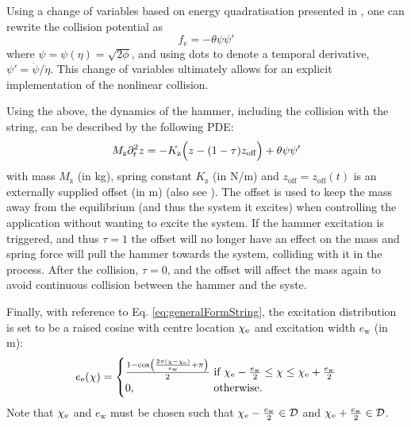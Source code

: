 \documentclass{article}
\begin{document}
Using a change of variables based on energy quadratisation presented in \cite{Ducceschi2021}, one can rewrite the collision potential as
\begin{equation}
    f_\text{e} = -\theta\psi \psi'
\end{equation}
where $\psi = \psi(\eta) = \sqrt{2\phi}$, and using dots to denote a temporal derivative, $\psi' = \dot \psi / \dot \eta$. This change of variables ultimately allows for an explicit implementation of the nonlinear collision. 

Using the above, the dynamics of the hammer, including the collision with the string, can be described by the following PDE:
\begin{equation}\label{eq:massSpring}
    M_\text{z}\partial_t^2 z = -K_\text{z} \Big(z - (1-\tau)z_\text{off}\Big) + \theta \psi\psi'
\end{equation}
with mass $M_\text{z}$ (in kg), spring constant $K_\text{z}$ (in N/m) and $z_\text{off} = z_\text{off}(t)$ is an externally supplied offset (in m) (also see \cite{Willemsen2020}). The offset is used to keep the mass away from the equilibrium (and thus the system it excites) when controlling the application without wanting to excite the system. If the hammer excitation is triggered, and thus $\tau = 1$ the offset will no longer have an effect on the mass and spring force will pull the hammer towards the system, colliding with it in the process. After the collision, $\tau = 0$, and the offset will affect the mass again to avoid continuous collision between the hammer and the syste. 

Finally, with reference to Eq. \eqref{eq:generalFormString}, the excitation distribution is set to be a raised cosine with centre location $\chi_{\text{e}}$ and excitation width $e_\text{w}$ (in m):
\begin{equation}\label{eq:raisedCos}
    e_\etxt(\chi) = \begin{cases}
        \frac{1 - \cos\left(\frac{2\pi (\chi - \chi_\etxt)}{e_\text{w}} + \pi\right)}{2}&\!\!\!\!\text{if}\ \chi_\etxt - \frac{e_\text{w}}{2}\leq \chi \leq \chi_\etxt + \frac{e_\text{w}}{2}\\
        0,& \!\!\!\!\text{otherwise.}
        \end{cases}
\end{equation}
Note that $\chi_{\text{e}} $ and $e_\text{w}$ must be chosen such that $\chi_{\text{e}} - \frac{e_\text{w}}{2}\in \mathcal{D}$ and $\chi_{\text{e}} + \frac{e_\text{w}}{2} \in \mathcal{D}$.
\end{document}
